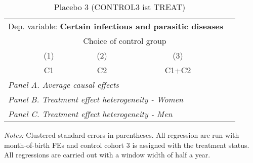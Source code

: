  \begin{table}[H] \centering \begin{threeparttable} \caption{Placebo 3 (CONTROL3 ist TREAT) } {\def\sym#1{\ifmmode^{#1}\else\(^{#1}\)\fi} \begin{tabular}{l*{4}{c}} \toprule \multicolumn{4}{l}{Dep. variable: \textbf{Certain infectious and parasitic diseases}} \\ & \multicolumn{3}{c}{Choice of control group} \\ \cmidrule(lr){2-4}
            &\multicolumn{1}{c}{(1)}&\multicolumn{1}{c}{(2)}&\multicolumn{1}{c}{(3)}\\
            &\multicolumn{1}{c}{C1}&\multicolumn{1}{c}{C2}&\multicolumn{1}{c}{C1+C2}\\
\midrule
 \multicolumn{4}{l}{\emph{Panel A. Average causal effects}} \\      \midrule\multicolumn{4}{l}{\emph{Panel B. Treatment effect heterogeneity - Women}} \\      \midrule\multicolumn{4}{l}{\emph{Panel C. Treatment effect heterogeneity - Men}} \\      
\bottomrule \end{tabular} } \begin{tablenotes} \item \scriptsize \emph{Notes:} Clustered standard errors in parentheses. All regression are run with month-of-birth FEs and control cohort 3 is assigned with the treatment status. All regressions are carried out with a window width of half a year. \end{tablenotes} \end{threeparttable} \end{table} 
